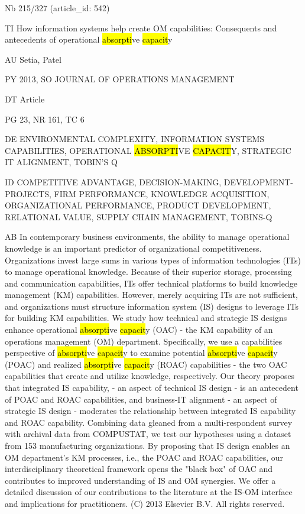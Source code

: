 \documentclass[a4paper]{article}
\begin{document}
\vspace*{-2cm}
Nb \tabto{0cm}215/327 (article\_id: 542)\par
TI \tabto{0cm}How information systems help create OM capabilities: Consequents and antecedents of operational \hl{absorpti}ve \hl{capacit}y\par
AU \tabto{0cm}Setia, Patel\par
PY \tabto{0cm}2013, SO JOURNAL OF OPERATIONS MANAGEMENT\par
DT \tabto{0cm}Article\par
PG \tabto{0cm}23, NR 161, TC 6\par
DE \tabto{0cm}ENVIRONMENTAL COMPLEXITY, INFORMATION SYSTEMS CAPABILITIES, OPERATIONAL \hl{ABSORPTI}VE \hl{CAPACIT}Y, STRATEGIC IT ALIGNMENT, TOBIN'S Q\par
ID \tabto{0cm}COMPETITIVE ADVANTAGE, DECISION-MAKING, DEVELOPMENT-PROJECTS, FIRM PERFORMANCE, KNOWLEDGE ACQUISITION, ORGANIZATIONAL PERFORMANCE, PRODUCT DEVELOPMENT, RELATIONAL VALUE, SUPPLY CHAIN MANAGEMENT, TOBINS-Q\par
AB \tabto{0cm}In contemporary business environments, the ability to manage operational knowledge is an important predictor of organizational competitiveness. Organizations invest large sums in various types of information technologies (ITs) to manage operational knowledge. Because of their superior storage, processing and communication capabilities, ITs offer technical platforms to build knowledge management (KM) capabilities. However, merely acquiring ITs are not sufficient, and organizations must structure information system (IS) designs to leverage ITs for building KM capabilities. We study how technical and strategic IS designs enhance operational \hl{absorpti}ve \hl{capacit}y (OAC) - the KM capability of an operations management (OM) department. Specifically, we use a capabilities perspective of \hl{absorpti}ve \hl{capacit}y to examine potential \hl{absorpti}ve \hl{capacit}y (POAC) and realized \hl{absorpti}ve \hl{capacit}y (ROAC) capabilities - the two OAC capabilities that create and utilize knowledge, respectively. Our theory proposes that integrated IS capability, - an aspect of technical IS design - is an antecedent of POAC and ROAC capabilities, and business-IT alignment - an aspect of strategic IS design - moderates the relationship between integrated IS capability and ROAC capability. Combining data gleaned from a multi-respondent survey with archival data from COMPUSTAT, we test our hypotheses using a dataset from 153 manufacturing organizations. By proposing that IS design enables an OM department's KM processes, i.e., the POAC and ROAC capabilities, our interdisciplinary theoretical framework opens the "black box" of OAC and contributes to improved understanding of IS and OM synergies. We offer a detailed discussion of our contributions to the literature at the IS-OM interface and implications for practitioners. (C) 2013 Elsevier B.V. All rights reserved.\par
\clearpage
\end{document}

